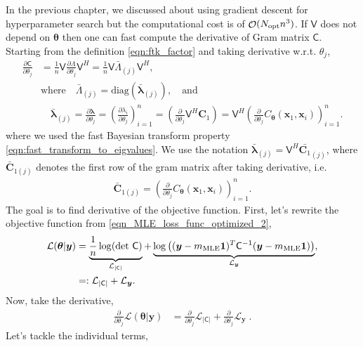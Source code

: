 \documentclass{iitthesis}          %
\DeclareMathOperator{\Order}{{\mathcal O}}
\newcommand{\bm}[1]{\boldsymbol{#1}}
\newcommand{\vlambda}{{\bm{\lambda}}}
\newcommand{\vtheta}{{\bm{\theta}}}
\newcommand{\vC}{\bm{C}}
\newcommand{\vx}{\bm{x}}
\newcommand{\vy}{\bm{y}}
\newcommand{\vone}{\bm{1}}
\newcommand{\mC}{\mathsf{C}}
\newcommand{\mCInv}{{\mathsf{C}^{-1}}}
\newcommand{\mLambda}{\mathsf{\Lambda}}
\newcommand{\mV}{\mathsf{V}}
\newcommand{\MLE}{\textup{MLE}}
\newcommand{\opt}{\textup{opt}}
\newcommand{\diag}{\text{diag}}
\def\abs#1{\ensuremath{\left \lvert #1 \right \rvert}}
\begin{document}
 \label{deriv_obj_func_MLE} 
In the previous chapter, we discussed about using gradient descent for hyperparameter search but the computational cost is of $\Order(N_{\opt} n^3)$.
If $\mV$ does not depend on $\vtheta$ then one can fast compute the derivative of Gram matrix $\mC$. Starting from the definition \eqref{eqn:ftk_factor} and taking derivative w.r.t. $\theta_j$, 
\begin{align*}
\displaystyle \frac{\partial \mC}{\partial \theta_j} 
& = \frac 1n \mV \frac{\partial {\mLambda}}{\partial \theta_j} \mV^H
= \frac 1n \mV \bar{\mLambda}_{(j)} \mV^H,
\\
& \text{where} \quad \bar{\mLambda}_{(j)} = \diag(\bar{\vlambda}_{(j)}), \quad \text{and}
\\
&  \quad \bar{\vlambda}_{(j)} = \frac{\partial \vlambda}{\partial \theta_j} = \left( \frac{\partial \lambda_i}{\partial \theta_j} \right)_{i=1}^n 
 = \left( \frac{\partial }{\partial \theta_j} \mV^H {\vC_1} \right)
 = \mV^H \left( \frac{\partial }{\partial \theta_j} {C_\vtheta(\vx_1,\vx_i)} \right)_{i=1}^n.
\end{align*}
where we used the fast Bayesian transform property \eqref{eqn:fast_transform_to_eigvalues}.
We use the notation $\bar{\vlambda}_{(j)} = \mV^H \bar{\vC_1}_{(j)}$,  where $\bar{\vC}_{1(j)}$ denotes the first row of the gram matrix after taking derivative, i.e.
\begin{align*}
\bar{\vC}_{1{(j)}} = \left(\frac{\partial }{\partial{\theta}_j} C_\vtheta(\vx_1,\vx_i) \right)_{i=1}^n.
\end{align*}
The goal is to find derivative of the objective function. First, let's rewrite the objective function from \eqref{eqn_MLE_loss_func_optimized_2},
\begin{align*}
\mathcal{L}(\vtheta | \vy) &= 
\underbrace{\frac{1}{n}  \log(\det\, \mC)}_{\mathcal{L}_{\abs{\mC}}} + \underbrace{\log\left((\vy-m_\MLE\vone)^T\mCInv(\vy-m_\MLE\vone) \right)}_{\mathcal{L}_{\vy}},
\\ &=: \mathcal{L}_{\abs{\mC}} + \mathcal{L}_{\vy}.
\end{align*}
Now, take the derivative,
\begin{align*}
\frac{\partial}{\partial \theta_j} \mathcal{L}(\vtheta | \vy)
&=  \frac{\partial}{\partial \theta_j} \mathcal{L}_{\abs{\mC}} + \frac{\partial}{\partial \theta_j} \mathcal{L}_{\vy} \;.
\end{align*}
Let's tackle the individual terms,
\end{document}
